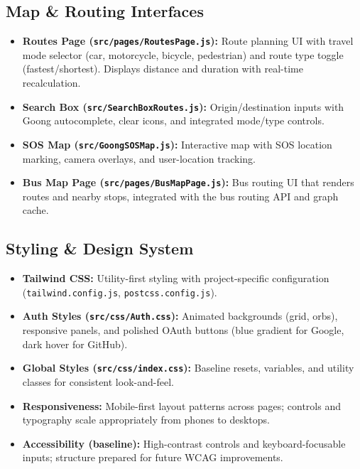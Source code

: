 \subsection{Map \& Routing Interfaces}
\begin{itemize}
    \item \textbf{Routes Page (\texttt{src/pages/RoutesPage.js}):} Route planning UI with travel mode selector (car, motorcycle, bicycle, pedestrian) and route type toggle (fastest/shortest). Displays distance and duration with real-time recalculation.
    \item \textbf{Search Box (\texttt{src/SearchBoxRoutes.js}):} Origin/destination inputs with Goong autocomplete, clear icons, and integrated mode/type controls.
    \item \textbf{SOS Map (\texttt{src/GoongSOSMap.js}):} Interactive map with SOS location marking, camera overlays, and user-location tracking.
    \item \textbf{Bus Map Page (\texttt{src/pages/BusMapPage.js}):} Bus routing UI that renders routes and nearby stops, integrated with the bus routing API and graph cache.
\end{itemize}

\subsection{Styling \& Design System}
\begin{itemize}
    \item \textbf{Tailwind CSS:} Utility-first styling with project-specific configuration (\texttt{tailwind.config.js}, \texttt{postcss.config.js}).
    \item \textbf{Auth Styles (\texttt{src/css/Auth.css}):} Animated backgrounds (grid, orbs), responsive panels, and polished OAuth buttons (blue gradient for Google, dark hover for GitHub).
    \item \textbf{Global Styles (\texttt{src/css/index.css}):} Baseline resets, variables, and utility classes for consistent look-and-feel.
    \item \textbf{Responsiveness:} Mobile-first layout patterns across pages; controls and typography scale appropriately from phones to desktops.
    \item \textbf{Accessibility (baseline):} High-contrast controls and keyboard-focusable inputs; structure prepared for future WCAG improvements.
\end{itemize}

